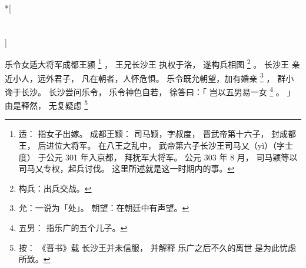 
\switchcolumn[0]*[\section{}]

乐令女适大将军成都王颍%
\footnote{%
    适：
        指女子出嫁。
    成都王颖：
        司马颖，字叔度，
        晋武帝第十六子，
        封成都王，
        后进位大将军。
        在八王之乱中，
        武帝第六子长沙王司马乂（yì）（字士度）
        于公元 301 年入京都，
        拜抚军大将军。
        公元 303 年 8 月，
        司马颖等以司马乂专权，起兵讨伐。
        这里所述就是这一时期内的事。
}%
，
王兄长沙王
执权于洛，
遂构兵相图%
\footnote{%
    构兵：出兵交战。
}%
。
长沙王
亲近小人，远外君子，
凡在朝者，人怀危惧。
乐令既允朝望，加有婚亲%
\footnote{%
    允：一说为「处」。
    朝望：在朝廷中有声望。
}%
，
群小谗于长沙。
长沙尝问乐令，
乐令神色自若，
徐答曰：「
    岂以五男易一女%
    \footnote{%
        五男：
            指乐广的五个儿子。
    }%
    。
」
由是释然，
无复疑虑%
\footnote{%
    按：
        《晋书》载
        长沙王并未信服，
        并解释
        乐广之后不久的离世
        是为此忧虑所致。
}%

\switchcolumn


